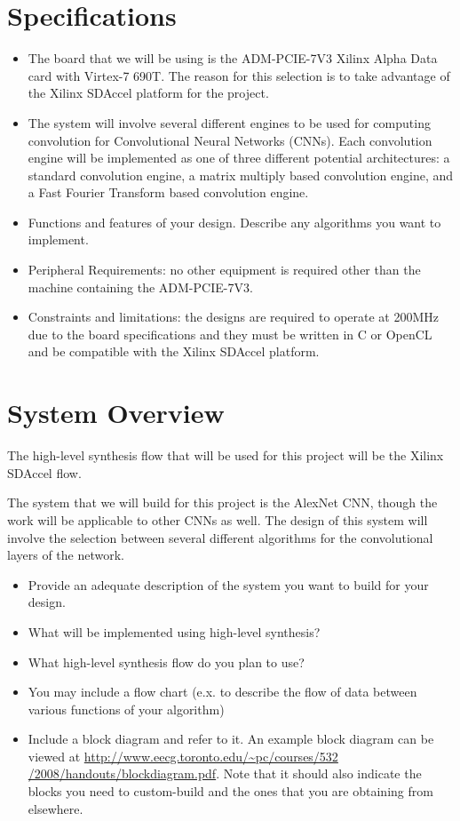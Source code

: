 \documentclass[conference,compsoc]{IEEEtran/IEEEtran}
\begin{document}
\section{Specifications}
\begin{itemize}
\item The board that we will be using is the ADM-PCIE-7V3 Xilinx Alpha Data card 
with Virtex-7 690T. The reason for this selection is to take advantage of the 
Xilinx SDAccel platform for the project. 

\item The system will involve several different engines to be used for computing 
convolution for Convolutional Neural Networks (CNNs). Each convolution engine 
will be implemented as one of three different potential architectures: a standard 
convolution engine, a matrix multiply based convolution engine, and a Fast Fourier 
Transform based convolution engine. 

\item Functions and features of your design.
Describe any algorithms you want to implement.


\item Peripheral Requirements: no other equipment is required other than the machine 
containing the ADM-PCIE-7V3.
\item Constraints and limitations: the designs are required to operate at 200MHz due 
to the board specifications and they must be written in C or OpenCL and be compatible 
with the Xilinx SDAccel platform. 
\end{itemize}

\section{System Overview}

The high-level synthesis flow that will be used for this project will be the Xilinx 
SDAccel flow. 

The system that we will build for this project is the AlexNet CNN, though the work 
will be applicable to other CNNs as well. The design of this system will involve the 
selection between several different algorithms for the convolutional layers of the 
network.

\begin{itemize}
\item Provide an adequate description of the system you want to build for your design.
\item What will be implemented using high-level synthesis?
\item What high-level synthesis flow do you plan to use?
\item You may include a flow chart (e.x. to describe the flow of data between various functions of your algorithm)
\item Include a block diagram and refer to it.
An example block diagram can be viewed at \href{http://www.eecg.toronto.edu/~pc/courses/532/2008/handouts/blockdiagram.pdf}{http://www.eecg.toronto.edu/\~{}pc/courses/532 /2008/handouts/blockdiagram.pdf}.
Note that it should also indicate the blocks you need to custom-build and the ones that you are obtaining from elsewhere.
\end{itemize}
\end{document}
